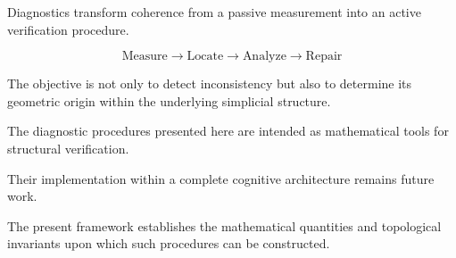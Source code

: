 
\begin{center}


\end{center}


\begin{highlightbox}


\BodyFont

Diagnostics transform coherence from a passive measurement into an active
verification procedure.

\[
\boxed{
\text{Measure}
\rightarrow
\text{Locate}
\rightarrow
\text{Analyze}
\rightarrow
\text{Repair}
}
\]

The objective is not only to detect inconsistency but also to determine
its geometric origin within the underlying simplicial structure.

\end{highlightbox}


\begin{remarkbox}

\BodyFont

The diagnostic procedures presented here are intended as mathematical
tools for structural verification.

Their implementation within a complete cognitive architecture remains
future work.

The present framework establishes the mathematical quantities and
topological invariants upon which such procedures can be constructed.

\end{remarkbox}